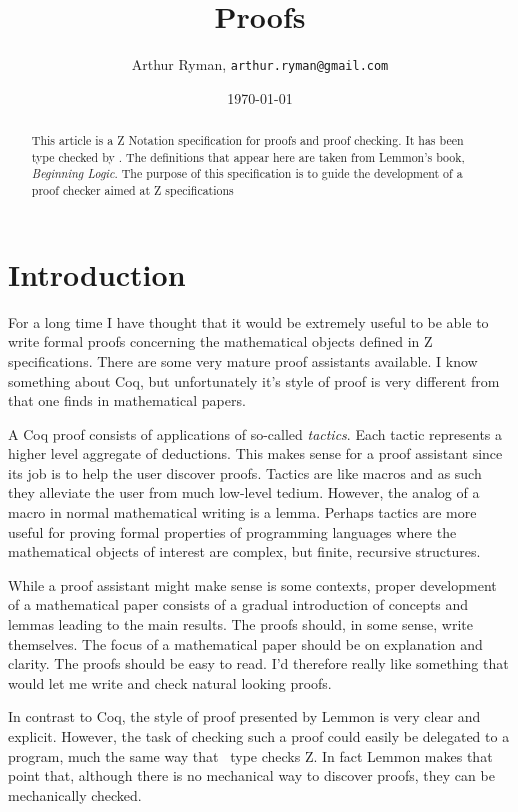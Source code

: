 \documentclass[11pt, oneside]{article}
\title{Proofs}
\author{Arthur Ryman, {\tt arthur.ryman@gmail.com}}
\date{\today}
\begin{document}
\maketitle

\begin{abstract}
This article is a Z Notation specification for proofs and proof checking.
It has been type checked by \fuzz.
The definitions that appear here are taken from Lemmon's book, {\it Beginning Logic}.
The purpose of this specification is to guide the development of a proof checker
aimed at Z specifications
\end{abstract}

\section{Introduction}

For a long time I have thought that it would be extremely useful to be able to write formal proofs
concerning the mathematical objects defined in Z specifications.
There are some very mature proof assistants available.
I know something about Coq, but unfortunately it's style of proof is very different from that one finds in mathematical
papers.

A Coq proof consists of applications of so-called {\it tactics}.
Each tactic represents a higher level aggregate of deductions.
This makes sense for a proof assistant since its job is to help the user discover proofs.
Tactics are like macros and as such they alleviate the user from much low-level tedium.
However, the analog of a macro in normal mathematical writing is a lemma.
Perhaps tactics are more useful for proving formal properties of programming languages where the mathematical
objects of interest are complex, but finite, recursive structures.

While a proof assistant might make sense is some contexts, proper development of a mathematical paper
consists of a gradual introduction of concepts and lemmas leading to the main results.
The proofs should, in some sense, write themselves.
The focus of a mathematical paper should be on explanation and clarity.
The proofs should be easy to read.
I'd therefore really like something that would let me write and check natural looking proofs.

In contrast to Coq, the style of proof presented by Lemmon is very clear and explicit.
However, the task of checking such a proof could easily be delegated to a program,
much the same way that \fuzz\ type checks Z.
In fact Lemmon makes that point that, although there is no mechanical way to discover proofs,
they can be mechanically checked.
\end{document}
